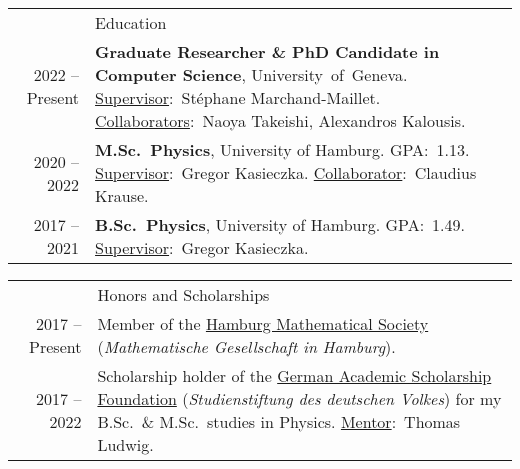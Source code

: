 \documentclass[11pt, a4paper]{article}
\newcommand{\headingfont}{\Large\color{OliveGreen}}
\newenvironment{SectionTable}[1]{
	\renewcommand*{\arraystretch}{1.7}
	\setlength{\tabcolsep}{10pt}
	\begin{longtable}{Rp{5.2in}} & #1 \\}
	{\end{longtable}\vspace{-.3cm}}
\newenvironment{SectionTableSingleSpace}[1]{
	\renewcommand*{\arraystretch}{1.2}
	\setlength{\tabcolsep}{10pt}
	\begin{longtable}{Rp{5.2in}} & #1 \\[0.6em]}
	{\end{longtable}\vspace{-.3cm}}
\begin{document}
	\begin{SectionTable}{\headingfont Education} 
		
		2022 -- Present & \textbf{Graduate Researcher \& PhD Candidate in Computer Science}, \mbox{University of Geneva}. \newline
		\underline{Supervisor}:~Stéphane Marchand-Maillet. \newline 
		\underline{Collaborators}:~Naoya Takeishi, Alexandros Kalousis.
		\\
		
		2020 -- 2022 & 
		\textbf{M.Sc.~Physics}, University of Hamburg. GPA:~1.13. \newline
		\underline{Supervisor}:~Gregor Kasieczka. \newline 
		\underline{Collaborator}:~Claudius Krause.
		\\
		
		2017 -- 2021 & 
		\textbf{B.Sc.~Physics}, University of Hamburg. GPA:~1.49. \newline
		\underline{Supervisor}:~Gregor Kasieczka.
		\\ 

		
		
		
	\end{SectionTable}
	
	
	\begin{SectionTableSingleSpace}{\headingfont Honors and Scholarships}
		2017 -- Present & 
		Member of the \href{https://www.mathges.hamburg/Veranstaltungen.html}{Hamburg Mathematical Society} (\textit{Mathematische Gesellschaft in Hamburg}). \\ 
		
		2017 -- 2022 & 
		Scholarship holder of the \href{https://www.studienstiftung.de/en/}{German Academic Scholarship Foundation} (\textit{\mbox{Studienstiftung} des deutschen Volkes}) 
        for my B.Sc.~\& M.Sc.~studies in Physics. \newline
        \underline{Mentor}:~Thomas Ludwig.
	\end{SectionTableSingleSpace}
	
\end{document}
